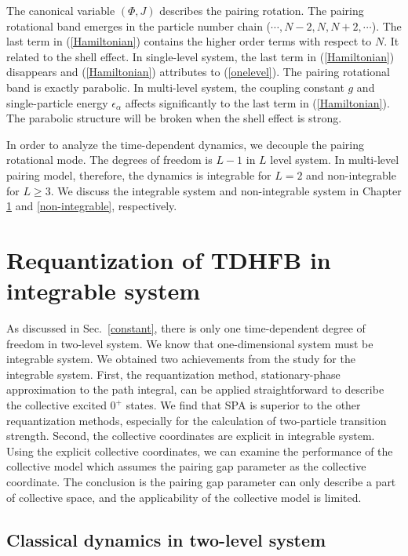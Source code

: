 \documentclass[11pt]{book} %
\begin{document}
The canonical variable $(\Phi,J)$ describes the pairing rotation. The pairing rotational band emerges in the particle number chain ($\cdots,N-2,N,N+2,\cdots$). The last term in (\ref{Hamiltonian}) contains the higher order terms with respect to $N$. It related to the shell effect. In single-level system, the last term in (\ref{Hamiltonian}) disappears and (\ref{Hamiltonian}) attributes to (\ref{onelevel}). The pairing rotational band is exactly parabolic. In multi-level system, the coupling constant $g$ and single-particle energy $\epsilon_{\alpha}$ affects significantly to the last term in (\ref{Hamiltonian}). The parabolic structure will be broken when the shell effect is strong. 

In order to analyze the time-dependent dynamics, we decouple the pairing rotational mode. The degrees of freedom is $L-1$ in $L$ level system. In multi-level pairing model, therefore, the dynamics is integrable for $L=2$ and non-integrable for $L\ge 3$. We discuss the integrable system and non-integrable system in Chapter \ref{integrable} and \ref{non-integrable}, respectively. 

\clearpage{\pagestyle{empty}\cleardoublepage}
\chapter{Requantization of TDHFB in integrable system}
\label{integrable}
As discussed in Sec.~\ref{constant}, there is only one time-dependent degree of freedom in two-level system. We know that one-dimensional system must be integrable system.
We obtained two achievements from the study for the integrable system. First, the requantization method, stationary-phase approximation to the path integral, can be applied straightforward to describe the collective excited $0^+$ states. We find that SPA is superior to the other requantization methods, especially for the calculation of two-particle transition strength. Second, the collective coordinates are explicit in integrable system. Using the explicit collective coordinates, we can examine the performance of the collective model which assumes the pairing gap parameter as the collective coordinate. The conclusion is the pairing gap parameter can only describe a part of collective space, and the applicability of the collective model is limited.

\section{Classical dynamics in two-level system}
\end{document}
